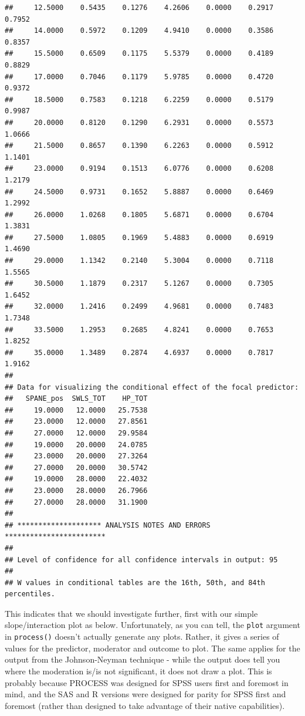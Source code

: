 \documentclass[
]{book}
\begin{document}
\begin{verbatim}
##     12.5000    0.5435    0.1276    4.2606    0.0000    0.2917    0.7952
##     14.0000    0.5972    0.1209    4.9410    0.0000    0.3586    0.8357
##     15.5000    0.6509    0.1175    5.5379    0.0000    0.4189    0.8829
##     17.0000    0.7046    0.1179    5.9785    0.0000    0.4720    0.9372
##     18.5000    0.7583    0.1218    6.2259    0.0000    0.5179    0.9987
##     20.0000    0.8120    0.1290    6.2931    0.0000    0.5573    1.0666
##     21.5000    0.8657    0.1390    6.2263    0.0000    0.5912    1.1401
##     23.0000    0.9194    0.1513    6.0776    0.0000    0.6208    1.2179
##     24.5000    0.9731    0.1652    5.8887    0.0000    0.6469    1.2992
##     26.0000    1.0268    0.1805    5.6871    0.0000    0.6704    1.3831
##     27.5000    1.0805    0.1969    5.4883    0.0000    0.6919    1.4690
##     29.0000    1.1342    0.2140    5.3004    0.0000    0.7118    1.5565
##     30.5000    1.1879    0.2317    5.1267    0.0000    0.7305    1.6452
##     32.0000    1.2416    0.2499    4.9681    0.0000    0.7483    1.7348
##     33.5000    1.2953    0.2685    4.8241    0.0000    0.7653    1.8252
##     35.0000    1.3489    0.2874    4.6937    0.0000    0.7817    1.9162
## 
## Data for visualizing the conditional effect of the focal predictor:
##   SPANE_pos  SWLS_TOT    HP_TOT
##     19.0000   12.0000   25.7538
##     23.0000   12.0000   27.8561
##     27.0000   12.0000   29.9584
##     19.0000   20.0000   24.0785
##     23.0000   20.0000   27.3264
##     27.0000   20.0000   30.5742
##     19.0000   28.0000   22.4032
##     23.0000   28.0000   26.7966
##     27.0000   28.0000   31.1900
## 
## ******************** ANALYSIS NOTES AND ERRORS ************************ 
## 
## Level of confidence for all confidence intervals in output: 95
## 
## W values in conditional tables are the 16th, 50th, and 84th percentiles.
\end{verbatim}

This indicates that we should investigate further, first with our simple slope/interaction plot as below. Unfortunately, as you can tell, the \texttt{plot} argument in \texttt{process()} doesn't actually generate any plots. Rather, it gives a series of values for the predictor, moderator and outcome to plot. The same applies for the output from the Johnson-Neyman technique - while the output does tell you where the moderation is/is not significant, it does not draw a plot. This is probably because PROCESS was designed for SPSS users first and foremost in mind, and the SAS and R versions were designed for parity for SPSS first and foremost (rather than designed to take advantage of their native capabilities).
\end{document}
